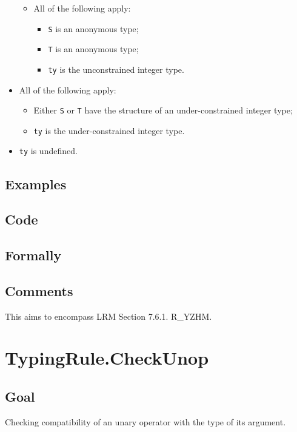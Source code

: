 \documentclass{book}
\begin{document}
\begin{itemize}
\begin{itemize}
      \item All of the following apply:
        \begin{itemize}
        \item \texttt{S} is an anonymous type;
        \item \texttt{T} is an anonymous type;
	\item \texttt{ty} is the unconstrained integer type. 
        \end{itemize}
    \end{itemize}

  \item All of the following apply:
    \begin{itemize}
    \item Either \texttt{S} or \texttt{T} have the structure of an under-constrained integer type;
    \item \texttt{ty} is the under-constrained integer type. 
    \end{itemize}

  \item \texttt{ty} is undefined.
  \end{itemize}

  \subsection{Examples}

  \subsection{Code}

  \subsection{Formally}

  \subsection{Comments}
    This aims to encompass LRM Section 7.6.1. R\_YZHM.

\section{TypingRule.CheckUnop \label{sec:TypingRule.CheckUnop}}

\subsection{Goal}
  Checking compatibility of an unary operator with the type of its argument.
\end{document}

